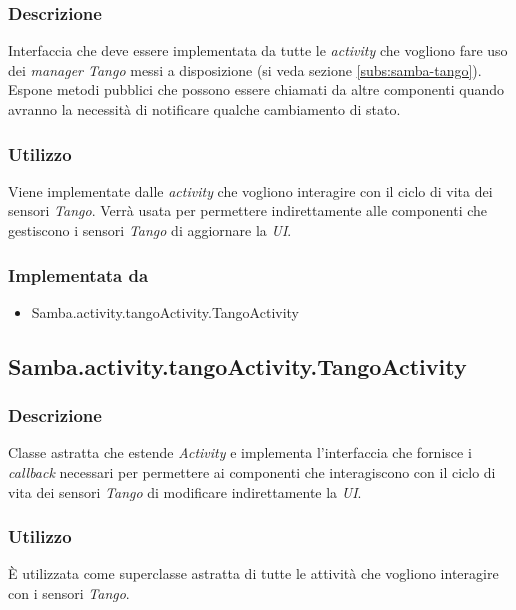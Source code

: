 \subsubsection{Descrizione}
Interfaccia che deve essere implementata da tutte le \emph{activity} che vogliono fare uso dei \emph{manager Tango} messi a disposizione (si veda sezione \ref{subs:samba-tango}). Espone metodi pubblici che possono essere chiamati da altre componenti quando avranno la necessità di notificare qualche cambiamento di stato.
\subsubsection{Utilizzo}
Viene implementate dalle \emph{activity} che vogliono interagire con il ciclo di vita dei sensori \emph{Tango}. Verrà usata per permettere indirettamente alle componenti che gestiscono i sensori \emph{Tango} di aggiornare la \emph{UI}.
\subsubsection{Implementata da}
\begin{itemize}
	\item Samba.activity.tangoActivity.TangoActivity
\end{itemize}

\subsection{Samba.activity.tangoActivity.TangoActivity}
\subsubsection{Descrizione}
Classe astratta che estende \emph{Activity} e implementa l'interfaccia che fornisce i \emph{callback} necessari per permettere ai componenti che interagiscono con il ciclo di vita dei sensori \emph{Tango} di modificare indirettamente la \emph{UI}.
\subsubsection{Utilizzo}
È utilizzata come superclasse astratta di tutte le attività che vogliono interagire con i sensori \emph{Tango}.

